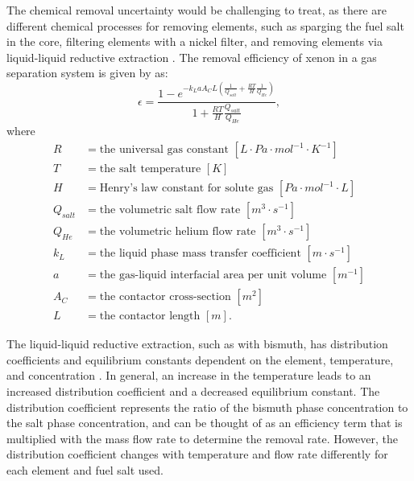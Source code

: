 The chemical removal uncertainty would be challenging to treat, as there are different chemical processes for removing elements, such as sparging the fuel salt in the core, filtering elements with a nickel filter, and removing elements via liquid-liquid reductive extraction \cite{rykhlevskii2020fuel}.
The removal efficiency of xenon in a gas separation system is given by \cite{peebles1968removal, rykhlevskii2020fuel} as:
\begin{equation}
    \epsilon = \frac{1-e^{-k_LaA_CL \left(\frac{1}{Q_{salt}}+\frac{RT}{H} \frac{1}{Q_{He}} \right) }}{1+\frac{RT}{H} \frac{Q_{salt}}{Q_{He}}},
    \label{eq:xe-eff}
\end{equation}
where
\begin{align}
    R &= \text{the universal gas constant $[L \cdot Pa \cdot mol^{-1} \cdot K^{-1}]$} \nonumber \\
    T &= \text{the salt temperature $[K]$} \nonumber \\
    H &= \text{Henry's law constant for solute gas $[Pa \cdot mol^{-1} \cdot L]$} \nonumber \\
    Q_{salt} &= \text{the volumetric salt flow rate $[m^{3} \cdot s^{-1}]$} \nonumber \\
    Q_{He} &= \text{the volumetric helium flow rate $[m^{3} \cdot s^{-1}]$} \nonumber \\
    k_L &= \text{the liquid phase mass transfer coefficient $[m \cdot s^{-1}]$} \nonumber \\
    a &= \text{the gas-liquid interfacial area per unit volume $[m^{-1}]$} \nonumber \\
    A_C &= \text{the contactor cross-section $[m^{2}]$ } \nonumber \\
    L &= \text{the contactor length $[m]$.} \nonumber
\end{align}

The liquid-liquid reductive extraction, such as with bismuth, has distribution coefficients and equilibrium constants dependent on the element, temperature, and concentration \cite{moriyama1984reductive}.
In general, an increase in the temperature leads to an increased distribution coefficient and a decreased equilibrium constant.
The distribution coefficient represents the ratio of the bismuth phase concentration to the salt phase concentration, and can be thought of as an efficiency term that is multiplied with the mass flow rate to determine the removal rate.
However, the distribution coefficient changes with temperature and flow rate differently for each element and fuel salt used.

